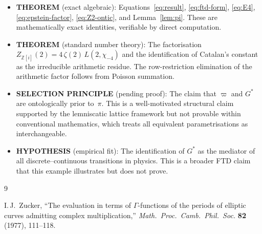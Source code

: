 \documentclass[12pt]{article}
\newcommand{\Z}{\mathbb{Z}}
\begin{document}
\begin{itemize}
\item \textbf{THEOREM} (exact algebraic): Equations~\eqref{eq:result},
\eqref{eq:ftd-form}, \eqref{eq:E4}, \eqref{eq:epstein-factor},
\eqref{eq:Z2-ontic}, and Lemma~\ref{lem:pi}.
These are mathematically exact identities, verifiable by direct computation.

\item \textbf{THEOREM} (standard number theory):
The factorisation $Z_{\Z[i]}(2)=4\,\zeta(2)\,L(2,\chi_{-4})$ and the
identification of Catalan's constant as the irreducible arithmetic
residue.  The row-restriction elimination of the arithmetic factor follows
from Poisson summation.

\item \textbf{SELECTION PRINCIPLE} (pending proof):
The claim that $\varpi$ and ${G^{*}}$ are ontologically prior to~$\pi$.
This is a well-motivated structural claim supported by the lemniscatic
lattice framework but not provable within conventional mathematics, which
treats all equivalent parametrisations as interchangeable.

\item \textbf{HYPOTHESIS} (empirical fit):
The identification of ${G^{*}}$ as the mediator of all
discrete--continuous transitions in physics.  This is a broader FTD claim
that this example illustrates but does not prove.
\end{itemize}

\begin{thebibliography}{9}

I.\,J.~Zucker,
``The evaluation in terms of $\Gamma$-functions of the periods of elliptic
curves admitting complex multiplication,''
\textit{Math.\ Proc.\ Camb.\ Phil.\ Soc.} \textbf{82} (1977), 111--118.

\end{thebibliography}
\end{document}
